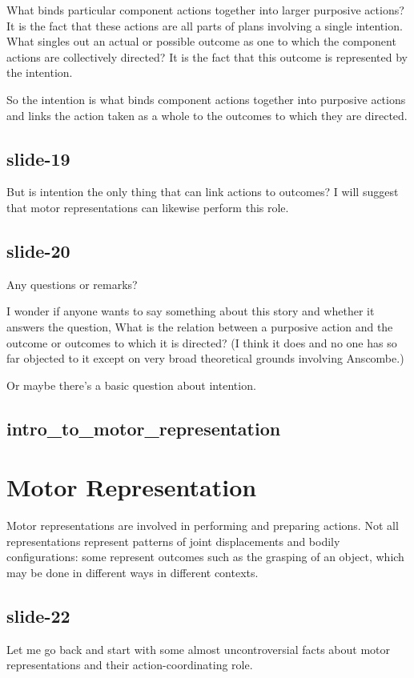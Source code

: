 \documentclass[12pt,\papersize]{extarticle}
\begin{document}
What binds particular component actions together into larger purposive actions?
It is the fact that these actions are all parts of plans involving a single intention.
What singles out an actual or possible outcome as one to which the component
actions are collectively directed? It is the fact that this outcome is
represented by the intention.
 
So the intention is what binds component actions together into purposive actions and
links the action taken as a whole to the outcomes to which they are directed.
 
\subsection{slide-19}
But is intention the only thing that can link actions to outcomes?
I will suggest that motor representations can likewise perform this role.
 
\subsection{slide-20}
Any questions or remarks?
 
I wonder if anyone wants to say something about this story and whether it answers the question,
What is the relation between a purposive action and the outcome or outcomes to which it is directed?
(I think it does and no one has so far objected to it except on very broad theoretical grounds
involving Anscombe.)
 
Or maybe there’s a basic question about intention.
 
\subsection{intro\_to\_motor\_representation}
 
 
\section{Motor Representation}
 
Motor representations are involved in performing and preparing actions.
Not all representations represent patterns of joint displacements and bodily
configurations: some represent outcomes such as the grasping of an object, which
may be done in different ways in different contexts.
 
\subsection{slide-22}
Let me go back and start with some almost uncontroversial facts about motor representations and
their action-coordinating role.
 
\end{document}
